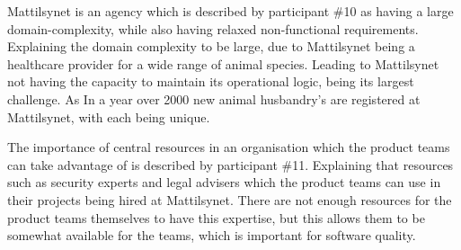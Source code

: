 Mattilsynet is an agency which is described by participant \#10 as having a large domain-complexity, while also having relaxed non-functional requirements. Explaining the domain complexity to be large, due to Mattilsynet being a healthcare provider for a wide range of animal species. Leading to Mattilsynet not having the capacity to maintain its operational logic, being its largest challenge. As In a year over 2000 new animal husbandry's are registered at Mattilsynet, with each being unique.


The importance of central resources in an organisation which the product teams can take advantage of is described by participant \#11. Explaining that resources such as security experts and legal advisers which the product teams can use in their projects being hired at Mattilsynet. There are not enough resources for the product teams themselves to have this expertise, but this allows them to be somewhat available for the teams, which is important for software quality.





